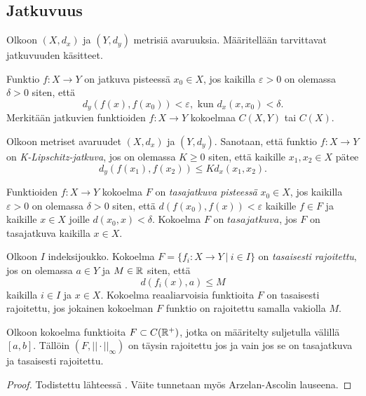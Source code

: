\documentclass[12pt,oneside,a4paper]{amsbook} %
\begin{document}
\subsection{Jatkuvuus}
Olkoon $(X, d_x)$ ja $(Y, d_y)$ metrisiä avaruuksia. Määritellään tarvittavat jatkuvuuden käsitteet.

\begin{definition}Funktio $f: X \to Y$ on jatkuva pisteessä $x_0 \in X$, jos kaikilla $\varepsilon > 0$ on olemassa $\delta > 0$ siten, että
\begin{equation*}
    d_y(f(x), f(x_0)) < \varepsilon, \text{ kun } d_x(x, x_0) < \delta.
\end{equation*}
Merkitään jatkuvien funktioiden $f: X \to Y$ kokoelmaa $C(X, Y)$ tai $C(X)$.
\end{definition}

\begin{definition}
    Olkoon metriset avaruudet $(X, d_x)$ ja $(Y, d_y)$. Sanotaan, että funktio  ${f:X\to Y}$ on \textit{K-Lipschitz-jatkuva}, jos on olemassa $K\ge 0$ siten, että kaikille $x_1,x_2 \in X$ pätee
    $$d_y(f(x_1),f(x_2)) \le Kd_x(x_1,x_2).$$
\end{definition}

\begin{definition}
Funktioiden $f:X \to Y$ kokoelma $F$ on \textit{tasajatkuva pisteessä} $x_0 \in X$, jos kaikilla $\varepsilon > 0 $ on olemassa $\delta > 0$ siten, että $d(f(x_0), f(x)) < \varepsilon$ kaikille $f \in F$ ja kaikille $x \in X$ joille $d(x_0, x) < \delta $. Kokoelma $F$ on $tasajatkuva$, jos $F$ on tasajatkuva kaikilla $x \in X$.
\end{definition}

\begin{definition}
    Olkoon $I$ indeksijoukko. Kokoelma $F = \{f_i : X \to Y \ | \ i \in I\}$ on \textit{tasaisesti rajoitettu}, jos on olemassa $a \in Y$ ja $M \in \mathbb{R}$ siten, että
    \begin{equation*}
        d(f_i(x), a) \le M
    \end{equation*} 
    kaikilla $i \in I$ ja $x \in X$.
    Kokoelma reaaliarvoisia funktioita $F$ on tasaisesti rajoitettu, jos jokainen kokoelman $F$ funktio on rajoitettu samalla vakiolla $M$.
\end{definition}

\begin{theorem}\label{thm:ascoli-arzela}
    Olkoon kokoelma funktioita $F \subset C({\mathbb{R}^{+}})$, jotka on määritelty suljetulla välillä $[a, b]$. Tällöin $(F, ||\cdot||_\infty)$ on täysin rajoitettu jos ja vain jos se on tasajatkuva ja tasaisesti rajoitettu.
\end{theorem}
\begin{proof}
    Todistettu lähteessä \cite[s. 158]{rudin}. Väite tunnetaan myös Arzelan-Ascolin lauseena.
\end{proof}
\end{document}
